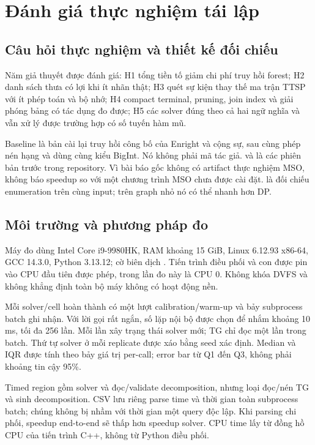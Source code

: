\chapter{Đánh giá thực nghiệm tái lập}
\label{chap:experiments}

\section{Câu hỏi thực nghiệm và thiết kế đối chiếu}

Năm giả thuyết được đánh giá: H1 tổng tiền tố giảm chi phí truy hồi forest; H2 danh sách thưa có lợi khi ít nhãn thật; H3 quét sự kiện thay thế ma trận TTSP với ít phép toán và bộ nhớ; H4 compact terminal, pruning, join index và giải phóng bảng có tác dụng đo được; H5 các solver đúng theo cả hai ngữ nghĩa và vẫn xử lý được trường hợp có số tuyến hàm mũ.

Baseline  là bản cài lại truy hồi công bố của Enright và cộng sự, sau cùng phép nén hạng và dùng cùng kiểu BigInt. Nó không phải mã tác giả.  và  là các phiên bản trước trong repository. Vì bài báo gốc không có artifact thực nghiệm MSO, không báo speedup so với một chương trình MSO chưa được cài đặt.  là đối chiếu enumeration trên cùng input; trên graph nhỏ nó có thể nhanh hơn DP.

\section{Môi trường và phương pháp đo}

Máy đo dùng Intel Core i9-9980HK, RAM khoảng 15 GiB, Linux 6.12.93 x86-64, GCC 14.3.0, Python 3.13.12; cờ biên dịch . Tiến trình điều phối và con được pin vào CPU đầu tiên được phép, trong lần đo này là CPU 0. Không khóa DVFS và không khẳng định toàn bộ máy không có hoạt động nền.

Mỗi solver/cell hoàn thành có một lượt calibration/warm-up và bảy subprocess batch ghi nhận. Với lời gọi rất ngắn, số lặp nội bộ được chọn để nhắm khoảng 10 ms, tối đa 256 lần. Mỗi lần xây trạng thái solver mới; TG chỉ đọc một lần trong batch. Thứ tự solver ở mỗi replicate được xáo bằng seed xác định. Median và IQR được tính theo bảy giá trị per-call; error bar từ Q1 đến Q3, không phải khoảng tin cậy 95\%.

Timed region gồm solver và đọc/validate decomposition, nhưng loại đọc/nén TG và sinh decomposition. CSV lưu riêng parse time và thời gian toàn subprocess batch; chúng không bị nhầm với thời gian một query độc lập. Khi parsing chi phối, speedup end-to-end sẽ thấp hơn speedup solver. CPU time lấy từ đồng hồ CPU của tiến trình C++, không từ Python điều phối.

